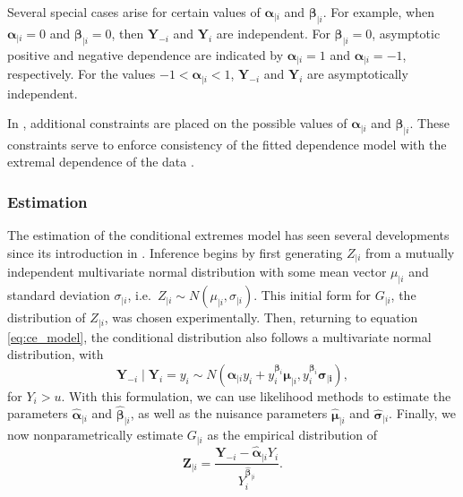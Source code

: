 \documentclass{article}
\numberwithin{equation}{section}
\begin{document}
Several special cases arise for certain values of $\bm{\alpha}_{\mid i}$ and $\bm{\beta}_{\mid i}$.
For example, when $\bm{\alpha}_{\mid i} = 0$ and $\bm{\beta}_{\mid i} = 0$, then $\bm{Y}_{-i}$ and $\bm{Y}_i$ are independent.
For $\bm{\beta}_{\mid i} = 0$, asymptotic positive and negative dependence are indicated by $\bm{\alpha}_{\mid i} = 1$ and $\bm{\alpha}_{\mid i} = -1$, respectively.
For the values $-1 < \bm{\alpha}_{\mid i} < 1$, $\bm{Y}_{-i}$ and $\bm{Y}_i$ are asymptotically independent.


In \citet{Keef2013}, additional constraints are placed on the possible values of $\bm{\alpha}_{\mid i}$ and $\bm{\beta}_{\mid i}$.
These constraints serve to enforce consistency of the fitted dependence model with the extremal dependence of the data \citep{Southworth2024_vignette}.

\subsubsection{Estimation} \label{subsubsec:estimation}

The estimation of the conditional extremes model has seen several developments since its introduction in \cite{Heffernan2004}.
Inference begins by first generating $Z_{\mid i}$ from a mutually independent multivariate normal distribution with some mean vector $\mu_{\mid i}$ and standard deviation $\sigma_{\mid i}$, i.e.\ $Z_{\mid i} \sim N(\mu_{\mid i}, \sigma_{\mid i})$. 
This initial form for $G_{\mid i}$, the distribution of $Z_{\mid i}$, was chosen experimentally. 
Then, returning to equation \eqref{eq:ce_model}, the conditional distribution also follows a multivariate normal distribution, with
\[
  \bm{Y}_{-i} \mid \bm{Y}_i = y_i \sim N\left(\bm{\alpha}_{\mid i} y_i + y_i^{\bm{\beta}_i} \bm{\mu}_{\mid i}, y_i^{\bm{\beta}_i} \bm{\sigma_{\mid i}}\right),
\]
for $Y_i > u$. 
With this formulation, we can use likelihood methods to estimate the parameters $\hat{\bm{\alpha}}_{\mid i}$ and $\hat{\bm{\beta}}_{\mid i}$, as well as the nuisance parameters $\hat{\bm{\mu}}_{\mid i}$ and $\hat{\bm{\sigma}}_{\mid i}$.
Finally, we now nonparametrically estimate $G_{\mid i}$ as the empirical distribution of 
\[
  \bm{Z}_{\mid i} = \frac{\bm{Y}_{-i} - \hat{\bm{\alpha}}_{\mid i}Y_i}{Y_i^{\hat{\bm{\beta}}_{\mid i}}}.
\]
\end{document}
